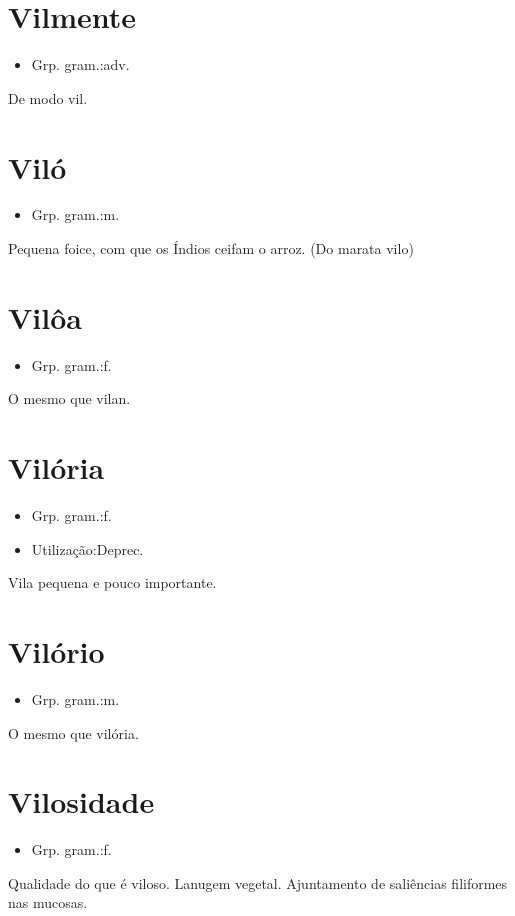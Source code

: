 \documentclass{article}
\begin{document}
\section{Vilmente}
\begin{itemize}
\item {Grp. gram.:adv.}
\end{itemize}
De modo vil.
\section{Viló}
\begin{itemize}
\item {Grp. gram.:m.}
\end{itemize}
Pequena foice, com que os Índios ceifam o arroz.
(Do marata \textunderscore vilo\textunderscore )
\section{Vilôa}
\begin{itemize}
\item {Grp. gram.:f.}
\end{itemize}
O mesmo que \textunderscore vilan\textunderscore .
\section{Vilória}
\begin{itemize}
\item {Grp. gram.:f.}
\end{itemize}
\begin{itemize}
\item {Utilização:Deprec.}
\end{itemize}
Vila pequena e pouco importante.
\section{Vilório}
\begin{itemize}
\item {Grp. gram.:m.}
\end{itemize}
O mesmo que \textunderscore vilória\textunderscore .
\section{Vilosidade}
\begin{itemize}
\item {Grp. gram.:f.}
\end{itemize}
Qualidade do que é viloso.
Lanugem vegetal.
Ajuntamento de saliências filiformes nas mucosas.
\end{document}
